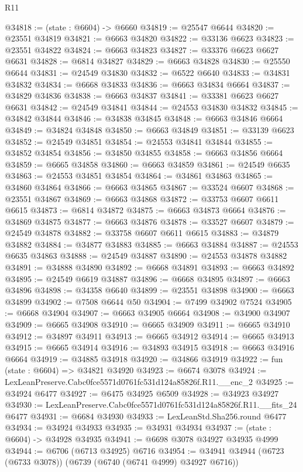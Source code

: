 \begin{lexlean}{R11}
\begin{coremodule}
@34818 := (state : @6604) -> @6660
@34819 := @25547 @6644
@34820 := @23551 @34819
@34821 := @6663 @34820
@34822 := @33136 @6623
@34823 := @23551 @34822
@34824 := @6663 @34823
@34827 := @33376 @6623 @6627 @6631
@34828 := @6814 @34827
@34829 := @6663 @34828
@34830 := @25550 @6644
@34831 := @24549 @34830
@34832 := @6522 @6640
@34833 := @34831 @34832
@34834 := @6668 @34833
@34836 := @6663 @34834 @6664
@34837 := @34829 @34836
@34838 := @6663 @34837
@34841 := @33381 @6623 @6627 @6631
@34842 := @24549 @34841
@34844 := @24553 @34830 @34832
@34845 := @34842 @34844
@34846 := @34838 @34845
@34848 := @6663 @34846 @6664
@34849 := @34824 @34848
@34850 := @6663 @34849
@34851 := @33139 @6623
@34852 := @24549 @34851
@34854 := @24553 @34841 @34844
@34855 := @34852 @34854
@34856 := @34850 @34855
@34858 := @6663 @34856 @6664
@34859 := @6665 @34858
@34860 := @6663 @34859
@34861 := @24549 @6635
@34863 := @24553 @34851 @34854
@34864 := @34861 @34863
@34865 := @34860 @34864
@34866 := @6663 @34865
@34867 := @33524 @6607
@34868 := @23551 @34867
@34869 := @6663 @34868
@34872 := @33753 @6607 @6611 @6615
@34873 := @6814 @34872
@34875 := @6663 @34873 @6664
@34876 := @34869 @34875
@34877 := @6663 @34876
@34878 := @33527 @6607
@34879 := @24549 @34878
@34882 := @33758 @6607 @6611 @6615
@34883 := @34879 @34882
@34884 := @34877 @34883
@34885 := @6663 @34884
@34887 := @24553 @6635 @34863
@34888 := @24549 @34887
@34890 := @24553 @34878 @34882
@34891 := @34888 @34890
@34892 := @6668 @34891
@34893 := @6663 @34892
@34895 := @24549 @6619 @34887
@34896 := @6668 @34895
@34897 := @6663 @34896
@34898 := @34358 @6640
@34899 := @23551 @34898
@34900 := @6663 @34899
@34902 := @7508 @6644 @50
@34904 := @7499 @34902 @7524
@34905 := @6668 @34904
@34907 := @6663 @34905 @6664
@34908 := @34900 @34907
@34909 := @6665 @34908
@34910 := @6665 @34909
@34911 := @6665 @34910
@34912 := @34897 @34911
@34913 := @6665 @34912
@34914 := @6665 @34913
@34915 := @6665 @34914
@34916 := @34893 @34915
@34918 := @6663 @34916 @6664
@34919 := @34885 @34918
@34920 := @34866 @34919
@34922 := fun (state : @6604) => @34821 @34920
@34923 := @6674 @3078
@34924 := LexLeanPreserve.Cabc0fce5571d0761fc531d124a85826f.R11.__enc_2
@34925 := @34924 @6477
@34927 := @6475 @34925 @6509
@34928 := @34923 @34927
@34930 := LexLeanPreserve.Cabc0fce5571d0761fc531d124a85826f.R11.__fits_24 @6477
@34931 := @6684 @34930
@34933 := LexLeanStd.Sha256.round @6477
@34934 := @34924 @34933
@34935 := @34931 @34934
@34937 := (state : @6604) -> @34928 @34935
@34941 := @6698 @3078 @34927 @34935 @4999
@34944 := @6706 (@6713 @34925) @6716
@34954 := @34941 @34944 (@6723 (@6733 @3078)) (@6739 (@6740 (@6741 @4999) @34927 @6716))

\end{coremodule}
\end{lexlean}
